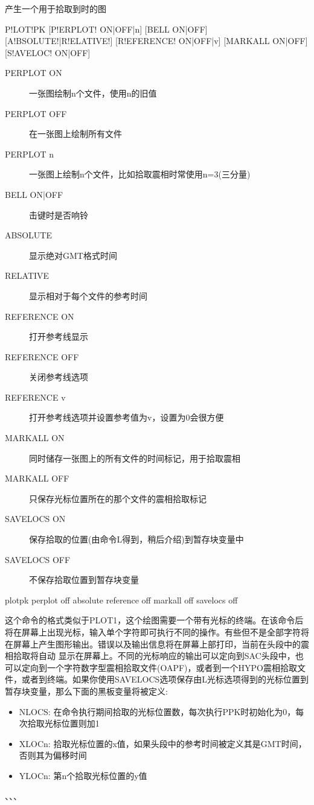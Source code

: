 \label{cmd:plotpk}

产生一个用于拾取到时的图

\begin{SACSTX}
P!LOT!PK [P!ERPLOT! ON|OFF|n] [BELL ON|OFF] [A!BSOLUTE!|R!ELATIVE!]
    [R!EFERENCE! ON|OFF|v] [MARKALL ON|OFF] [S!AVELOC! ON|OFF]
\end{SACSTX}

\begin{description}
\item [PERPLOT ON] 一张图绘制n个文件，使用n的旧值
\item [PERPLOT OFF] 在一张图上绘制所有文件
\item [PERPLOT n] 一张图上绘制n个文件，比如拾取震相时常使用n=3(三分量)
\item [BELL ON|OFF]  击键时是否响铃
\item [ABSOLUTE] 显示绝对GMT格式时间
\item [RELATIVE] 显示相对于每个文件的参考时间
\item [REFERENCE ON] 打开参考线显示
\item [REFERENCE OFF] 关闭参考线选项
\item [REFERENCE v] 打开参考线选项并设置参考值为v，设置为0会很方便
\item [MARKALL ON] 同时储存一张图上的所有文件的时间标记，用于拾取震相
\item [MARKALL OFF] 只保存光标位置所在的那个文件的震相拾取标记
\item [SAVELOCS ON]  保存拾取的位置(由命令L得到，稍后介绍)到暂存块变量中
\item [SAVELOCS OFF]  不保存拾取位置到暂存块变量
\end{description}

\begin{SACDFT}
plotpk perplot off absolute reference off markall off savelocs off
\end{SACDFT}

这个命令的格式类似于PLOT1，这个绘图需要一个带有光标的终端。在该命令后将在屏幕上出现光标，输入单个字符即可执行不同的操作。有些但不是全部字符将在屏幕上产生图形输出。错误以及输出信息将在屏幕上部打印，当前在头段中的震相拾取将自动	显示在屏幕上。不同的光标响应的输出可以定向到SAC头段中，也可以定向到一个字符数字型震相拾取文件(OAPF)，或者到一个HYPO震相拾取文件，或者到终端。如果你使用SAVELOCS选项保存由L光标选项得到的光标位置到暂存块变量，那么下面的黑板变量将被定义:
\begin{itemize}
\item NLOCS: 在命令执行期间拾取的光标位置数，每次执行PPK时初始化为0，每次拾取光标位置则加1
\item XLOCn: 拾取光标位置的x值，如果头段中的参考时间被定义其是GMT时间，否则其为偏移时间
\item YLOCn: 第n个拾取光标位置的y值
\end{itemize}

、、、
